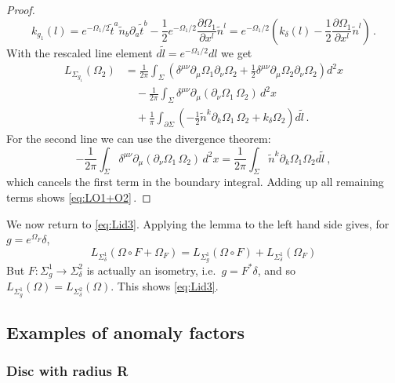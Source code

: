 \documentclass[11pt,a4paper]{article}
\numberwithin{equation}{section}
\begin{document}
\begin{proof}
%
\begin{equation}
    k_{g_1}(l) = e^{-\Omega_1/2}\tilde{t}^a \tilde{n}_b \partial_a \tilde{t}^b  -\frac{1}{2} e^{-\Omega_1/2} \frac{\partial \Omega_1}{\partial x^l} \tilde{n}^l = e^{-\Omega_1/2} \left(k_\delta(l) - \frac{1}{2} \frac{\partial \Omega_1}{\partial x^l} \tilde{n}^l \right)\,.
\end{equation}
%
With the rescaled line element $d\tilde{l} = e^{-\Omega_1/2} dl$ we get 
%
\begin{align}
    L_{\Sigma_{g_1}}(\Omega_2) &= \frac{1}{2\pi} \int_{\Sigma} \left(\delta^{\mu\nu}\partial_\mu\Omega_1\partial_\nu\Omega_2 +\frac{1}{2}\delta^{\mu\nu}\partial_\mu\Omega_2\partial_\nu\Omega_2\right)d^2x 
\nonumber
    \\
    &\quad - \frac{1}{2\pi} \int_{\Sigma} \delta^{\mu\nu} \partial_\mu\left(\partial_\nu\Omega_1\,\Omega_2\right)\,d^2x
\nonumber
    \\
    &\quad + \frac{1}{\pi} \int_{\partial\Sigma} \left(- \frac{1}{2}\tilde{n}^k \partial_k\Omega_1\, \Omega_2 + k_\delta \Omega_2\right)d\tilde{l}\,.
\end{align}
%
For the second line we can use the divergence theorem: 
%
\begin{equation}
    - \frac{1}{2\pi} \int_{\Sigma} \delta^{\mu\nu} \partial_\mu\left(\partial_\nu\Omega_1\,\Omega_2\right)\,d^2x = \frac{1}{2\pi} \int_{\Sigma} \tilde{n}^k \partial_k\Omega_1 \Omega_2 d\tilde{l}
    \ ,
\end{equation}
%
which cancels the first term in the boundary integral. Adding up all remaining terms shows \eqref{eq:LO1+O2}\,.
\end{proof}

We now return to \eqref{eq:Lid3}. Applying the lemma to the left hand side gives, for $g = e^{\Omega_F}\delta$,
\begin{equation}
    L_{\Sigma^1_\delta}(\Omega\circ F+\Omega_F)
    =
    L_{\Sigma^1_g}(\Omega\circ F) 
    + L_{\Sigma^1_\delta}(\Omega_F)
\end{equation}
But $F : \Sigma^1_g \to \Sigma^2_\delta$ is actually an isometry, i.e.\ $g = F^*\delta$, and so $L_{\Sigma^1_g}(\Omega) = L_{\Sigma^2_\delta}(\Omega)$. This shows \eqref{eq:Lid3}.

\subsection{Examples of anomaly factors}\label{app:anomalyExamples}

\subsubsection{Disc with radius R}\label{app:discfactor}
\end{document}
